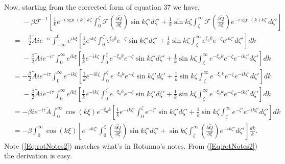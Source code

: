 \documentclass[12pt]{article}
\DeclareMathOperator{\sgn}{sgn}
\begin{document}
Now, starting from the corrected form of equation 37 we have,
\begin{align}
&\phantom{=} -\beta \mathcal{F}^{-1}\left[ \frac{1}{k}e^{-i\sgn(k) k \zeta} \int_0^\zeta \mathcal{F}\left(\frac{\partial \tilde{Q}}{\partial \xi}\right) \sin k\zeta' d\zeta' + \frac{1}{k}\sin k \zeta \int_\zeta^\infty \mathcal{F}\left(\frac{\partial \tilde{Q}}{\partial \xi}\right) e^{-i\sgn(k)k\zeta'} d\zeta' \right]
\label{Eq:start} \\
&=-\frac{\beta}{2} \tilde{A} i e^{-i\tau} \int_{-\infty}^{0} e^{ik\xi} \left[\frac{1}{k}e^{i k \zeta} \int_0^\zeta  e^{\xi_0 k} e^{-\zeta} \sin k\zeta' d\zeta' + \frac{1}{k}\sin k \zeta \int_\zeta^\infty  e^{\xi_0 k} e^{-\zeta} e^{ik\zeta'} d\zeta' \right] dk \\
&\phantom{=} -\frac{\beta}{2} \tilde{A} i e^{-i\tau} \int_{0}^{\infty} e^{ik\xi} \left[\frac{1}{k}e^{-i k \zeta} \int_0^\zeta  e^{-\xi_0 k} e^{-\zeta} \sin k\zeta' d\zeta' + \frac{1}{k}\sin k \zeta \int_\zeta^\infty  e^{-\xi_0 k} e^{-\zeta} e^{-i k\zeta'} d\zeta' \right] dk \\
&= -\frac{\beta}{2} \tilde{A} i e^{-i\tau} \int_{0}^{\infty} e^{-ik\xi} \left[\frac{1}{k}e^{-i k \zeta} \int_0^\zeta  e^{-\xi_0 k} e^{-\zeta} \sin k\zeta' d\zeta' + \frac{1}{k}\sin k \zeta \int_\zeta^\infty  e^{-\xi_0 k} e^{-\zeta} e^{-ik\zeta'} d\zeta' \right] dk \\
&\phantom{=} -\frac{\beta}{2} \tilde{A} i e^{-i\tau} \int_{0}^{\infty} e^{ik\xi} \left[\frac{1}{k}e^{-i k \zeta} \int_0^\zeta  e^{-\xi_0 k} e^{-\zeta} \sin k\zeta' d\zeta' + \frac{1}{k}\sin k \zeta \int_\zeta^\infty e^{-\xi_0 k} e^{-\zeta} e^{-i k\zeta'} d\zeta' \right] dk \\
&=-\beta i e^{-i\tau} \tilde{A} \int_{0}^{\infty} \cos\left(k\xi \right) e^{-\xi_0 k} \left[\frac{1}{k}e^{-i k \zeta'} \int_0^\zeta e^{-\zeta'}  \sin k\zeta' d\zeta' + \frac{1}{k}\sin k \zeta \int_\zeta^\infty e^{-\zeta'} e^{-ik\zeta'} d\zeta' \right] dk \label{Eq:rotNotes} \\ 
&=-\beta \int_{0}^{\infty} \cos\left(k\xi \right) \left[e^{-i k \zeta'} \int_0^\zeta \left(\frac{\partial \tilde{Q}}{\partial \xi}\right) \sin k\zeta' d\zeta' + \sin k \zeta \int_\zeta^\infty \left(\frac{\partial \tilde{Q}}{\partial \xi}\right) e^{-ik\zeta'} d\zeta' \right] \frac{dk}{k}. \label{Eq:rotNotes2}
\end{align}
Note (\ref{Eq:rotNotes2}) matches what's in Rotunno's notes. From (\ref{Eq:rotNotes2}) the derivation is easy.
\end{document}
